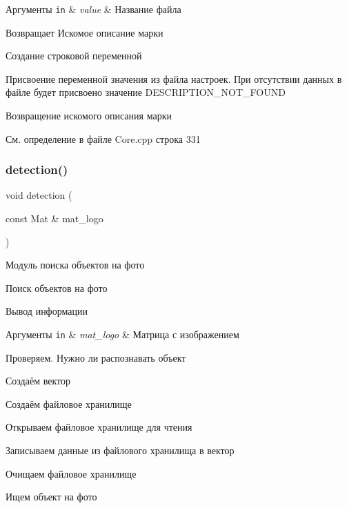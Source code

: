 \begin{DoxyParams}[1]{Аргументы}
\mbox{\tt in}  & {\em value} & Название файла \\
\hline
\end{DoxyParams}
\begin{DoxyReturn}{Возвращает}
Искомое описание марки 
\end{DoxyReturn}
Создание строковой переменной

Присвоение переменной значения из файла настроек. При отсутствии данных в файле будет присвоено значение D\+E\+S\+C\+R\+I\+P\+T\+I\+O\+N\+\_\+\+N\+O\+T\+\_\+\+F\+O\+U\+ND

Возвращение искомого описания марки 

См. определение в файле Core.\+cpp строка 331

\mbox{\label{group__corecpp_gae99907f19e7f09055012f68347a57d05}} 
\subsubsection{\texorpdfstring{detection()}{detection()}}
{\footnotesize\ttfamily void detection (\begin{DoxyParamCaption}\item[{const Mat \&}]{mat\+\_\+logo }\end{DoxyParamCaption})}



Модуль поиска объектов на фото 

Поиск объектов на фото

Вывод информации


\begin{DoxyParams}[1]{Аргументы}
\mbox{\tt in}  & {\em mat\+\_\+logo} & Матрица с изображением \\
\hline
\end{DoxyParams}
Проверяем. Нужно ли распознавать объект

Создаём вектор ~\newline


Создаём файловое хранилище

Открываем файловое хранилище для чтения

Записываем данные из файлового хранилища в вектор

Очищаем файловое хранилище

Ищем объект на фото

